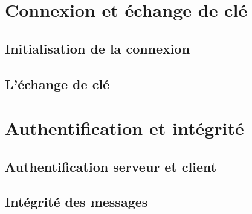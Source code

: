 \section{Connexion et échange de clé}
\subsection{Initialisation de la connexion}
\subsection{L'échange de clé}

\section{Authentification et intégrité}
\subsection{Authentification serveur et client}
\subsection{Intégrité des messages}